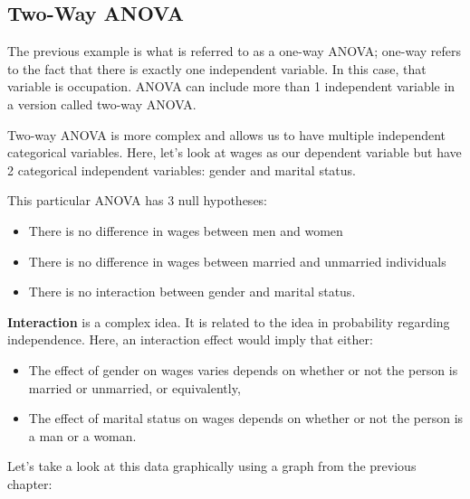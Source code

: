 \documentclass[
  letterpaper,
]{book}
\providecommand{\tightlist}{%
  \setlength{\itemsep}{0pt}\setlength{\parskip}{0pt}}\usepackage{longtable,booktabs,array}
\begin{document}
\subsection{Two-Way ANOVA}\label{two-way-anova}

The previous example is what is referred to as a one-way ANOVA; one-way
refers to the fact that there is exactly one independent variable. In
this case, that variable is occupation. ANOVA can include more than 1
independent variable in a version called two-way ANOVA.

Two-way ANOVA is more complex and allows us to have multiple independent
categorical variables. Here, let's look at wages as our dependent
variable but have 2 categorical independent variables: gender and
marital status.

This particular ANOVA has 3 null hypotheses:

\begin{itemize}
\tightlist
\item
  There is no difference in wages between men and women
\item
  There is no difference in wages between married and unmarried
  individuals
\item
  There is no interaction between gender and marital status.
\end{itemize}

\textbf{Interaction} is a complex idea. It is related to the idea in
probability regarding independence. Here, an interaction effect would
imply that either:

\begin{itemize}
\tightlist
\item
  The effect of gender on wages varies depends on whether or not the
  person is married or unmarried, or equivalently,
\item
  The effect of marital status on wages depends on whether or not the
  person is a man or a woman.
\end{itemize}

Let's take a look at this data graphically using a graph from the
previous chapter:
\end{document}
